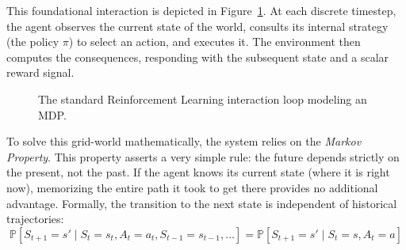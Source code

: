 This foundational interaction is depicted in Figure~\ref{fig:mdp_loop}. At each discrete timestep, the agent observes the current state of the world, consults its internal strategy (the policy $\pi$) to select an action, and executes it. The environment then computes the consequences, responding with the subsequent state and a scalar reward signal.

\begin{figure}[H]
\centering
{}
\caption{The standard Reinforcement Learning interaction loop modeling an MDP. }
\label{fig:mdp_loop}
\end{figure}

To solve this grid-world mathematically, the system relies on the \emph{Markov Property}. This property asserts a very simple rule: the future depends strictly on the present, not the past. If the agent knows its current state (where it is right now), memorizing the entire path it took to get there provides no additional advantage. Formally, the transition to the next state is independent of historical trajectories: 
\begin{equation}
    \mathbb{P}[S_{t+1} = s' \mid S_t = s_t, A_t = a_t, S_{t-1} = s_{t-1}, \dots] = \mathbb{P}[S_{t+1} = s' \mid S_t = s, A_t = a]
\end{equation}

